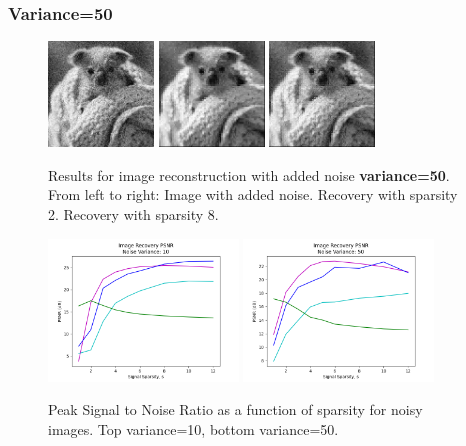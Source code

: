 \documentclass{article}
\begin{document}
\subsubsection*{Variance=50}
\begin{figure}[H]
    \captionsetup{width=.5\linewidth}
    \centering
        \includegraphics[width=0.25\textwidth]{images/koala_noise-50.png}
        \includegraphics[width=0.25\textwidth]{images/koala_noise-50-recovered_02.png}
        \includegraphics[width=0.25\textwidth]{images/koala_noise-50-recovered_08.png}
        \caption{Results for image reconstruction with added noise {\bf variance=50}. From left to right: Image with added noise. Recovery with sparsity 2. Recovery with sparsity 8.}
\end{figure}


\begin{figure}
    \captionsetup{width=.45\linewidth}
    \centering
        \includegraphics[width=0.45\textwidth]{plots/d3-noise-10.png}
        \includegraphics[width=0.45\textwidth]{plots/d3-noise-50.png}
        \caption{Peak Signal to Noise Ratio as a function of sparsity for noisy images. Top variance=10, bottom variance=50.}
\end{figure}
\end{document}

